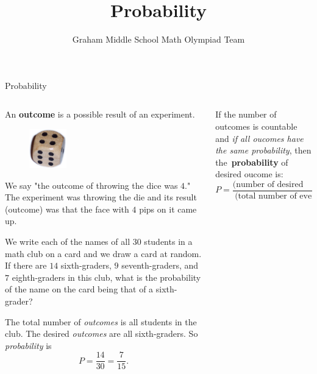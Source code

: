 \documentclass[9pt,aspectratio=169]{beamer}
\title{Probability}
\subtitle[Graham Middle School]{Graham Middle School Math Olympiad Team}
\begin{document}
\maketitle

\begin{frame}{Probability}
  \begin{columns}[T]
    \begin{column}{0.5\textwidth}
      \begin{definition}
        An \textbf{outcome} is a possible result of an experiment.
      \end{definition}

      \begin{figure}%
        \vspace{-1em}
        \includegraphics[width=0.25\textwidth]{03 - Probability/dice-4.png}
      \end{figure}
      We say "the outcome of throwing the dice was $4$." The experiment was throwing the die and its result (outcome) was that the face with $4$ pips on it came up.\medskip
  
      \begin{problem}
        We write each of the names of all $30$ students in a math club on a card and we draw a card at random. If there are $14$ sixth-graders, $9$ seventh-graders, and $7$ eighth-graders in this club, what is the probability of the name on the card being that of a sixth-grader? 
      \end{problem}
      The total number of \emph{outcomes} is all students in the club. The desired \emph{outcomes} are all sixth-graders. So \emph{probability} is
      \[
        P = \frac{14}{30} = \frac{7}{15}.
      \]
    \end{column}
    \begin{column}{0.5\textwidth}
      \begin{definition}
        If the number of outcomes is countable and \emph{if all oucomes have the same probability}, then \mbox{the~\textbf{probability}} of desired oucome is:
        \[ P = \frac{\text{(number of desired outcomes)}}{\text{(total number of events)}}. \]
        \vspace*{-1ex}
      \end{definition}


\end{column}
\end{columns}
\end{frame}
\end{document}
